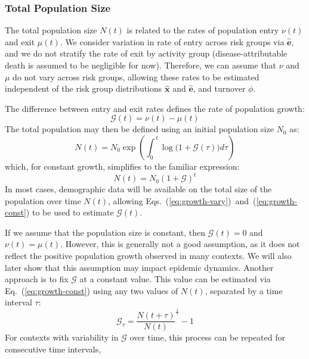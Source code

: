 \subsubsection{Total Population Size}\label{sss:params-nu-mu}
The total population size $N(t)$ is related to
the rates of population entry $\nu(t)$ and exit $\mu(t)$.
We consider variation in rate of entry across risk groups via $\bm{\hat{e}}$,
and we do not stratify the rate of exit by activity group
(disease-attributable death is assumed to be negligible for now).
Therefore, we can assume that $\nu$ and $\mu$ do not vary across risk groups,
allowing these rates to be estimated independent of
the risk group distributions $\bm{\hat{x}}$ and $\bm{\hat{e}}$, and turnover $\phi$.
\par
The difference between entry and exit rates
defines the rate of population growth:
\begin{equation}\label{eq:growth-G}
\mathcal{G}(t) = \nu(t) - \mu(t) 
\end{equation}
The total population may then be defined using an initial population size $N_0$ as:
\begin{equation}\label{eq:growth-vary}
  N(t) = N_0 \exp{\left(\int_{0}^{\,t}{\log\big(1+\mathcal{G}(\tau) \big)d\tau}\right)}
\end{equation}
which, for constant growth, simplifies to the familiar expression:
\begin{equation} \label{eq:growth-const}
  N(t) = N_0 {(1 + \mathcal{G})}^{t}
\end{equation}
In most cases, demographic data will be available
on the total size of the population over time $N(t)$,
allowing Eqs.~(\ref{eq:growth-vary})~and~(\ref{eq:growth-const})
to be used to estimate $\mathcal{G}(t)$.
\par
If we assume that the population size is constant, then $\mathcal{G}(t) = 0$ and $\nu(t) = \mu(t)$.
However, this is generally not a good assumption, 
as it does not reflect the positive population growth observed in many contexts.
We will also later show that this assumption may impact epidemic dynamics.
Another approach is to fix $\mathcal{G}$ at a constant value.
This value can be estimated via Eq.~(\ref{eq:growth-const})
using any two values of $N(t)$, separated by a time interval $\tau$:
\begin{equation}
\mathcal{G}_{\tau} = {\frac{N(t+\tau)}{N(t)}}^{\frac{1}{\tau}} -1
\end{equation}
For contexts with variability in $\mathcal{G}$ over time,
this process can be repeated for consecutive time intervals,
